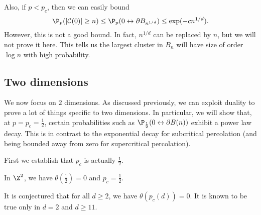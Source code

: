 \documentclass[a4paper]{article}
\begin{document}
Also, if $p < p_c$, then we can easily bound
\[
  \P_p(|\mathcal{C}(0)| \geq n) \leq \P_p(0 \leftrightarrow \partial B_{n^{1/d}}) \leq \exp(-c n^{1/d}).
\]
However, this is not a good bound. In fact, $n^{1/d}$ can be replaced by $n$, but we will not prove it here. This tells us the largest cluster in $B_n$ will have size of order $\log n$ with high probability.

\subsection{Two dimensions}
We now focus on $2$ dimensions. As discussed previously, we can exploit duality to prove a lot of things specific to two dimensions. In particular, we will show that, at $p = p_c = \frac{1}{2}$, certain probabilities such as $\P_{\frac{1}{2}} (0 \leftrightarrow \partial B(n))$ exhibit a power law decay. This is in contrast to the exponential decay for subcritical percolation (and being bounded away from zero for supercritical percolation).

First we establish that $p_c$ is actually $\frac{1}{2}$.
\begin{thm}
  In $\Z^2$, we have $\theta \left(\frac{1}{2}\right) = 0$ and $p_c = \frac{1}{2}$.
\end{thm}
It is conjectured that for all $d \geq 2$, we have $\theta(p_c(d)) = 0$. It is known to be true only in $d = 2$ and $d \geq 11$.
\end{document}

